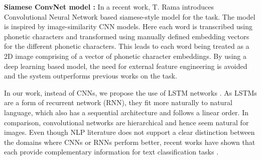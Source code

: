 \textbf{Siamese ConvNet model : } In a recent work, T. Rama introduces Convolutional Neural Network based siamese-style model \citep{rama2016siamese} for the task. The model is inspired by image-similarity CNN models. Here each word is transcribed using phonetic characters and transformed using manually defined embedding vectors for the different phonetic characters. This leads to each word being treated as a 2D image comprising of a vector of phonetic character embeddings. By using a deep learning based model, the need for external feature engineering is avoided and the system outperforms previous works on the task.

In our work, instead of CNNs, we propose the use of LSTM networks \citep{lstm1997}. As LSTMs are a form of recurrent network (RNN), they fit more naturally to natural language, which also has a sequential architecture and follows a linear order. In comparison, convolutional networks are hierarchical and hence seem natural for images. Even though NLP literature does not support a clear distinction between the domains where CNNs or RNNs perform better, recent works have shown that each provide complementary information for text classification tasks \citep{yin2017comparative}. 
